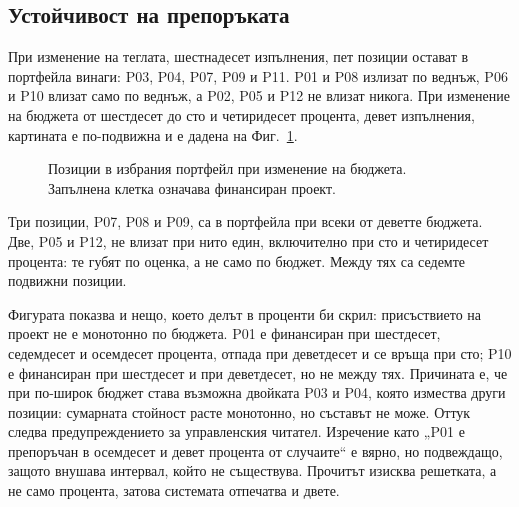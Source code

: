 \subsection{Устойчивост на препоръката}

При изменение на теглата, шестнадесет изпълнения, пет позиции остават в портфейла
винаги: P03, P04, P07, P09 и P11. P01 и P08 излизат по веднъж, P06 и P10 влизат
само по веднъж, а P02, P05 и P12 не влизат никога. При изменение на бюджета от
шестдесет до сто и четиридесет процента, девет изпълнения, картината е
по-подвижна и е дадена на Фиг.~\ref{fig:stability}.

\begin{figure}[H]
\centering
{}
\caption{Позиции в избрания портфейл при изменение на бюджета. Запълнена клетка означава финансиран проект.}
\label{fig:stability}
\end{figure}

Три позиции, P07, P08 и P09, са в портфейла при всеки от деветте бюджета. Две,
P05 и P12, не влизат при нито един, включително при сто и четиридесет процента:
те губят по оценка, а не само по бюджет. Между тях са седемте подвижни позиции.

Фигурата показва и нещо, което делът в проценти би скрил: присъствието на проект
не е монотонно по бюджета. P01 е финансиран при шестдесет, седемдесет и осемдесет
процента, отпада при деветдесет и се връща при сто; P10 е финансиран при
шестдесет и при деветдесет, но не между тях. Причината е, че при по-широк бюджет
става възможна двойката P03 и P04, която измества други позиции: сумарната
стойност расте монотонно, но съставът не може. Оттук следва предупреждението за
управленския читател. Изречение като „P01 е препоръчан в осемдесет и девет
процента от случаите“ е вярно, но подвеждащо, защото внушава интервал, който не
съществува. Прочитът изисква решетката, а не само процента, затова системата
отпечатва и двете.

